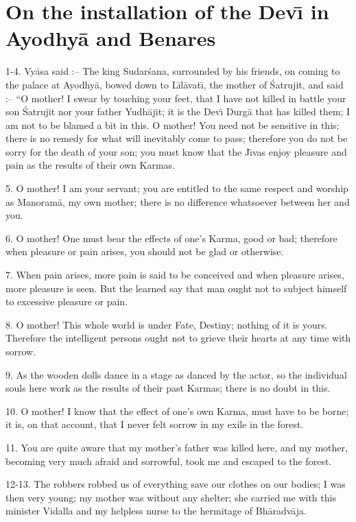 \chapter{On the installation of the Dev\={\i} in Ayodhy\=a and Benares}

1-4. Vy\=asa said :-- The king Sudar\'sana, surrounded by his friends, on coming to the palace at Ayodhy\=a, bowed down to L\={\i}l\=avat\={\i}, the mother of \'Satrujit, and said :-- ``O mother! I swear by touching your feet, that I have not killed in battle your son \'Satrujit nor your father Yudh\=ajit; it is the Dev\={\i} Durg\=a that has killed them; I am not to be blamed a bit in this. O mother! You need not be sensitive in this; there is no remedy for what will inevitably come to pass; therefore you do not be sorry for the death of your son; you must know that the J\={\i}vas enjoy pleasure and pain as the results of their own Karmas.

5. O mother! I am your servant; you are entitled to the same respect and worship as Manoram\=a, my own mother; there is no difference whatsoever between her and you.

6. O mother! One must bear the effects of one's Karma, good or bad; therefore when pleasure or pain arises, you should not be glad or otherwise.

7. When pain arises, more pain is said to be conceived and when pleasure arises, more pleasure is seen. But the learned say that man ought not to subject himself to excessive pleasure or pain.

8. O mother! This whole world is under Fate, Destiny; nothing of it is yours. Therefore the intelligent persons ought not to grieve their hearts at any time with sorrow.

9. As the wooden dolls dance in a stage as danced by the actor, so the individual souls here work as the results of their past Karmas; there is no doubt in this.

10. O mother! I know that the effect of one's own Karma, must have to be borne; it is, on that account, that I never felt sorrow in my exile in the forest.

11. You are quite aware that my mother's father was killed here, and my mother, becoming very much afraid and sorrowful, took me and escaped to the forest.

12-13. The robbers robbed us of everything save our clothes on our bodies; I was then very young; my mother was without any shelter; she carried me with this minister Vidalla and my helpless nurse to the hermitage of Bh\=aradv\=aja.

